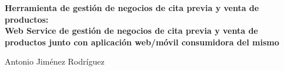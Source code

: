 \thispagestyle{empty}

\begin{center}
{\large\bfseries Herramienta de gestión de negocios de cita previa y venta de productos: \\
Web Service de gestión de negocios de cita previa y venta de productos junto con
aplicación web/móvil consumidora del mismo }\\
\end{center}
\begin{center}
Antonio Jiménez Rodríguez\\
\end{center}


\vspace{0.5cm}
\vspace{0.7cm}


